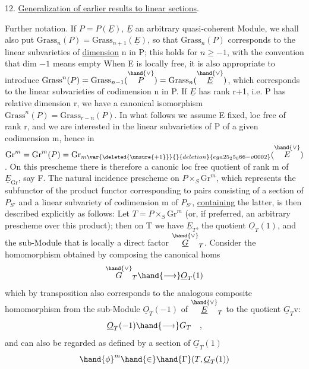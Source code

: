 
12. \uline{Generalization of earlier results to linear sections}.

Further notation. If $P = P(\underline{E})$, $\underline{E}$ an arbitrary quasi-coherent
Module, we shall also put $\mathrm{Grass}_n(P) = \mathrm{Grass}_{n+1}(\underline{E})$, so that
$\mathrm{Grass}_n(P)$ corresponds to the linear subvarieties of \uline{dimension} n in
P; this holds for $n \geq -1$, with the convention that dim $-1$ means empty
When E is locally free,  it is also appropriate to introduce
$\mathrm{Grass}^n(P) = \mathrm{Grass}_{n-1}(\overset{\hand{\vee}}{P}) = \mathrm{Grass}_n(\overset{\hand{\vee}}{\underline{E}})$, which corresponds to the linear
subvarieties of codimension n in P. If $\underline{E}$ has rank r+1, i.e.
P has relative dimension r, we have a canonical isomorphism
$\mathrm{Grass}^n(P) = \mathrm{Grass}_{r-n}(P)$. In what follows we assume E fixed, loc
free of rank r, and we are interested in the linear subvarieties
of P of a given codimension m, hence in $\mathrm{Gr}^m = \mathrm{Gr}^m(P) = \mathrm{Gr}_{m\var{\deleted{\unsure{+1}}}{}{deletion}{ega25_25_066-v0002}}(\overset{\hand{\vee}}{E})$.
On this prescheme there is therefore a canonic loc free quotient  of rank m
of $\underline{E}_{\mathrm{Gr}}$, say F.  The natural incidence prescheme
on $P\times_S \mathrm{Gr}^m$, which represents the subfunctor of the product functor
corresponding to pairs consisting of a section of $P_{S'}$ and a linear
subvariety of codimension m of $P_{S'}$, \uline{containing} the latter, is then described
explicitly as follows: Let $T=P\times_S \mathrm{Gr}^m$ (or, if preferred, an
arbitrary prescheme over this product); then on  T we have
$\underline{E}_T$, the quotient $\underline{O}_T(1)$, and the sub-Module that is locally a direct factor
$\overset{\hand{\vee}}{\underline{G}}_T$. Consider the homomorphism obtained by composing the canonical homs
\[ \overset{\hand{\vee}}{G}_T \hand{\longrightarrow} \underline{O}_T(1) \]
which by transposition also corresponds to the analogous composite
homomorphism from the sub-Module $\underline{O}_T(-1)$ of $\overset{\hand{\vee}}{\underline{E}}_T$ to the quotient $\underline{G}_T\mathrm{v}$:
\[ \underline{O}_T(-1) \hand{\longrightarrow} G_T \quad , \]
and can also be regarded as defined by a section of $\underline{G}_T(1)$
\[ \hand{\phi}^m \hand{\in} \hand{\Gamma}(T, \underline{G}_T(1)) \]

